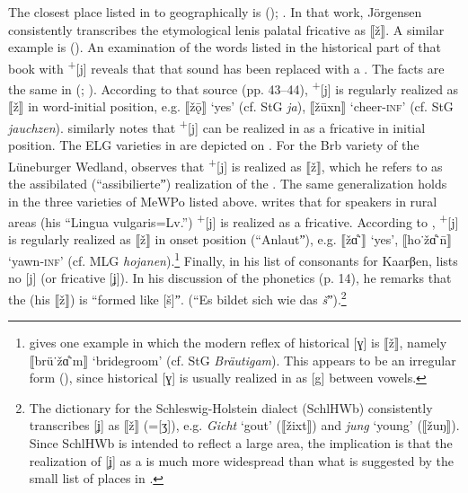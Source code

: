 \begin{xlist}
The closest place listed in  to  geographically is  (\citealt{Jörgensen1928}); . In that work, Jörgensen consistently transcribes the  etymological lenis palatal fricative as ⟦ž⟧. A similar example is  (\citealt{Sievers1914}). An examination of the words listed in the historical part of that book with  \textsuperscript{+}[j] reveals that that sound has been replaced with a . The facts are the same in  (\citealt{Schmeding1937}; ). According to that source (pp. 43--44),  \textsuperscript{+}[j] is regularly realized as ⟦ž⟧ in word-initial position, e.g. ⟦žǭ⟧ ‘yes’ (cf. StG \textit{ja}), ⟦žūxn⟧ ‘cheer\textsc{{}-inf}’ (cf. StG \textit{jauchzen}). \citet[7]{Höder2010} similarly notes that  \textsuperscript{+}[j] can be realized in  as a  fricative in initial position. The ELG varieties in  are depicted on . For the Brb variety of the Lüneburger Wedland, \citet[55--57]{Selmer1918} observes that  \textsuperscript{+}[j] is realized as ⟦ž⟧, which he refers to as the assibilated (“assibilierteˮ) realization of the . The same generalization holds in the three varieties of MeWPo listed above. \citet[148]{Kolz1914} writes that for speakers in rural areas (his “Lingua vulgaris=Lv.”)  \textsuperscript{+}[j] is realized as a  fricative. According to \citet[123]{Jacobs1925b},  \textsuperscript{+}[j] is regularly realized as ⟦ž⟧ in onset position (“Anlautˮ), e.g. ⟦žɑ̊˙⟧ ‘yes’, ⟦ho˙žɑ̊˙\={n}⟧ ‘yawn\textsc{{}-inf}’ (cf. MLG \textit{hojanen}).\footnote{\citet[130]{Jacobs1925b} gives one example in which the modern reflex of historical [ɣ] is ⟦ž⟧, namely ⟦brü˙žɑ̊˙m⟧ ‘bridegroom’ (cf. StG \textit{Bräutigam}). This appears to be an irregular form (), since historical [ɣ] is usually realized in  as [g] between vowels.} Finally, in his list of consonants for Kaarβen, \citet[12]{Dützmann1932} lists no [j] (or fricative [ʝ]). In his discussion of the phonetics (p. 14), he remarks that the  (his ⟦ž⟧) is “formed like [š]ˮ. (“Es bildet sich wie das \textit{š}ˮ).\footnote{The dictionary for the Schleswig-Holstein dialect (SchlHWb) consistently transcribes [ʝ] as ⟦ž⟧ (=[ʒ]), e.g. \textit{Gicht} ‘gout’ (⟦žixt⟧) and \textit{jung} ‘young’ (⟦žuŋ⟧). Since SchlHWb is intended to reflect a large area, the implication is that the realization of [ʝ] as a  is much more widespread than what is suggested by the small list of places in .}


\end{xlist}
